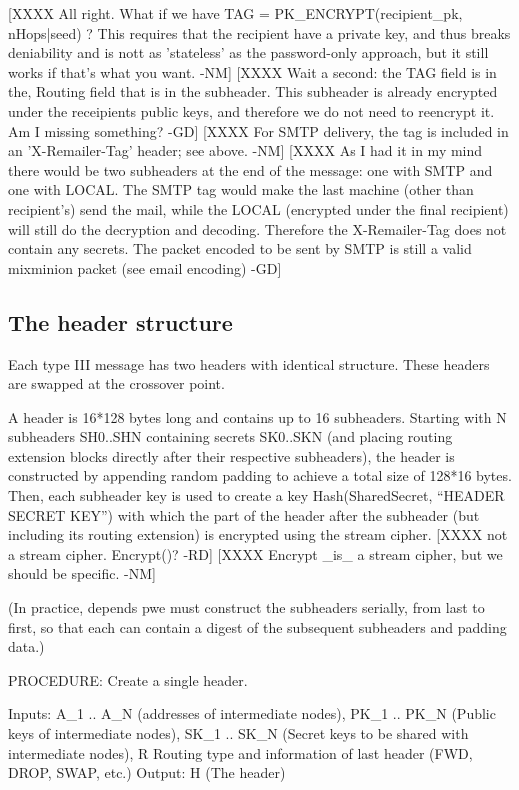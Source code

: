 [XXXX All right.  What if we have 
         TAG = PK_ENCRYPT(recipient_pk, nHops|seed) ?  
      This requires
      that the recipient have a private key, and thus breaks
      deniability and is nott as 'stateless' as the password-only
      approach, but it still works if that's what you want.  -NM]
[XXXX Wait a second: the TAG field is in the, Routing field that is in the 
      subheader. This subheader is already encrypted under the receipients
      public keys, and therefore we do not need to reencrypt it.
      Am I missing something? -GD]
[XXXX For SMTP delivery, the tag is included in an 'X-Remailer-Tag'
      header; see above. -NM]
[XXXX As I had it in my mind there would be two subheaders at the end
         of the message: one with SMTP and one with LOCAL. The SMTP
         tag would make the last machine (other than recipient's) send
         the mail, while the LOCAL (encrypted under the final
         recipient) will still do the decryption and
         decoding. Therefore the X-Remailer-Tag does not contain any
         secrets. The packet encoded to be sent by SMTP is still a
         valid mixminion packet (see email encoding) -GD]

\subsection{The header structure}

Each type III message has two headers with identical structure. These
headers are swapped at the crossover point.

A header is 16*128 bytes long and contains up to 16
subheaders. Starting with N subheaders SH0..SHN containing secrets
SK0..SKN (and placing routing extension blocks directly after their
respective subheaders), the header is constructed by appending 
random padding to achieve a total size
of 128*16 bytes. Then, each subheader key is used to create a key
Hash(SharedSecret, ``HEADER SECRET KEY'') with which the part of the
header after the subheader (but including its routing extension) is
encrypted using the stream cipher. 
[XXXX not a stream cipher. Encrypt()? -RD]
[XXXX Encrypt _is_ a stream cipher, but we should be specific. -NM]

(In practice, depends pwe must construct the subheaders serially, from last to
first, so that each can contain a digest of the subsequent subheaders
and padding data.) 

PROCEDURE: Create a single header.

Inputs: A_1 .. A_N (addresses of intermediate nodes), 
	PK_1 .. PK_N (Public keys of intermediate nodes),
	SK_1 .. SK_N (Secret keys to be shared with intermediate nodes),
        R Routing type and information of last header (FWD, DROP, SWAP, etc.)
Output: H (The header)

